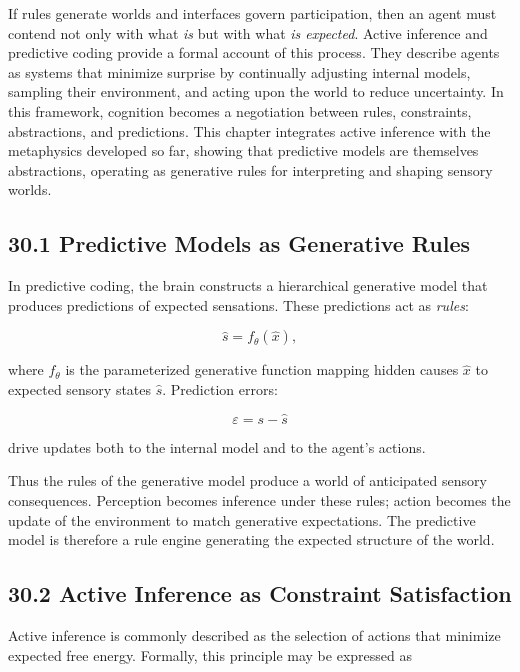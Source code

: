 \documentclass[12pt,letterpaper]{article}
\theoremstyle{remark}
\begin{document}
If rules generate worlds and interfaces govern participation, then an agent must contend not only with what \emph{is} but with what \emph{is expected}. Active inference and predictive coding provide a formal account of this process. They describe agents as systems that minimize surprise by continually adjusting internal models, sampling their environment, and acting upon the world to reduce uncertainty. In this framework, cognition becomes a negotiation between rules, constraints, abstractions, and predictions.  
This chapter integrates active inference with the metaphysics developed so far, showing that predictive models are themselves abstractions, operating as generative rules for interpreting and shaping sensory worlds.

\subsection{30.1 Predictive Models as Generative Rules}

In predictive coding, the brain constructs a hierarchical generative model that produces predictions of expected sensations. These predictions act as \emph{rules}:

\[
\hat{s} = f_\theta(\hat{x}),
\]

where \(f_\theta\) is the parameterized generative function mapping hidden causes \(\hat{x}\) to expected sensory states \(\hat{s}\).  
Prediction errors:

\[
\varepsilon = s - \hat{s}
\]

drive updates both to the internal model and to the agent’s actions.

Thus the rules of the generative model produce a world of anticipated sensory consequences. Perception becomes inference under these rules; action becomes the update of the environment to match generative expectations. The predictive model is therefore a rule engine generating the expected structure of the world.

\subsection{30.2 Active Inference as Constraint Satisfaction}

Active inference is commonly described as the selection of actions that minimize expected free energy. Formally, this principle may be expressed as
\end{document}
